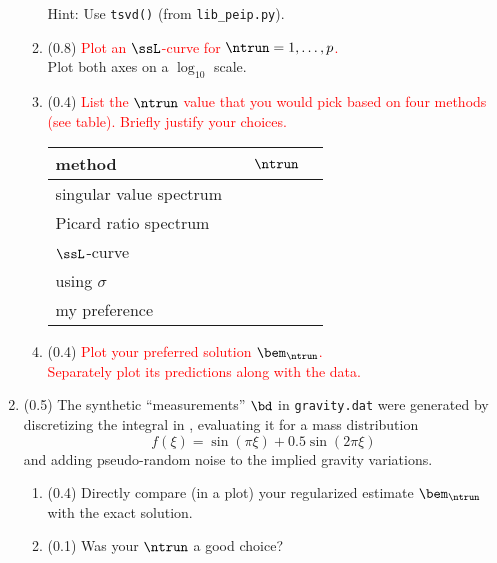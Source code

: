 \documentclass[11pt,titlepage,fleqn]{article}
\newcommand{\mv}{\xi}  %
\begin{document}
\begin{enumerate}
\begin{enumerate}
Hint: Use \verb+tsvd()+ (from \verb+lib_peip.py+).

\item (0.8) \textcolor{red}{Plot an $\ssL$-curve \citep[][p.~95]{Aster} for $\ntrun = 1,\ldots,p$.} \\
Plot both axes on a $\log_{10}$ scale.

\item (0.4) \textcolor{red}{List the $\ntrun$ value that you would pick based on four methods (see table). Briefly justify your choices.}

\begin{center}
\begin{tabular}{l|l}
\hline
method & $\;\;\;\;\ntrun\;\;\;\;$ \\ \hline\hline
singular value spectrum & \\ \hline
Picard ratio spectrum & \\ \hline
$\ssL$-curve & \\ \hline
using $\sigma$ \\ \hline
my preference \\ \hline
\end{tabular}
\end{center}

\item (0.4) \textcolor{red}{Plot your preferred solution $\bem_{\ntrun}$. \\
Separately plot its predictions along with the data.}

\end{enumerate}
\label{prob2}


\item (0.5) The synthetic ``measurements'' $\bd$ in \verb+gravity.dat+ were generated by discretizing the integral in , evaluating it for a mass distribution 
%
\begin{equation}
f(\mv) = \sin(\pi\mv) + 0.5 \sin(2\pi\mv)
\end{equation}
%
and adding pseudo-random noise to the implied gravity variations.

\begin{enumerate}
\item (0.4) Directly compare (in a plot) your regularized estimate $\bem_{\ntrun}$ with the exact solution.
\item (0.1) Was your $\ntrun$ a good choice?
\end{enumerate}

\end{enumerate}
\end{document}
